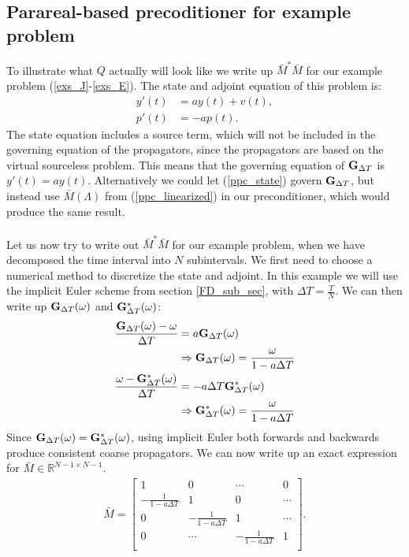 \subsection{Parareal-based precoditioner for example problem}
To illustrate what $Q$ actually will look like we write up $\bar M^*\bar M$ for our example problem (\ref{exs_J}-\ref{exs_E}). The state and adjoint equation of this problem is:
\begin{align}
y'(t) &= ay(t) + v(t), \label{ppc_state} \\
p'(t) &= -ap(t). \label{ppc_adjoint}
\end{align}
The state equation includes a source term, which will not be included in the governing equation of the propagators, since the propagators are based on the virtual sourceless problem. This means that the governing equation of $\bold G_{\Delta T}$ is $y'(t) = ay(t)$. Alternatively we could let (\ref{ppc_state}) govern $\bold G_{\Delta T}$, but instead use $\bar M(\Lambda)$ from (\ref{ppc_linearized}) in our preconditioner, which would produce the same result. 
\\
\\
Let us now try to write out $\bar M^*\bar M$ for our example problem, when we have decomposed the time interval into $N$ subintervals. We first need to choose a numerical method to discretize the state and adjoint. In this example we will use the implicit Euler scheme from section \ref{FD_sub_sec}, with $\Delta T=\frac{T}{N}$. We can then write up $\bold G_{\Delta T}(\omega)$ and $\bold G_{\Delta T}^*(\omega)$:
\begin{align*}
\frac{\bold G_{\Delta T}(\omega)-\omega}{\Delta T}&=  a\bold G_{\Delta T}(\omega) \\
&\Rightarrow \bold G_{\Delta T}(\omega)= \frac{\omega}{1-a\Delta T} \\
\frac{\omega-\bold G_{\Delta T}^*(\omega)}{\Delta T}&= -a\Delta T \bold G_{\Delta T}^*(\omega) \\
&\Rightarrow \bold G_{\Delta T}^*(\omega)= \frac{\omega}{1-a\Delta T} 
\end{align*}
Since $\bold G_{\Delta T}(\omega)= \bold G_{\Delta T}^*(\omega)$, using implicit Euler both forwards and backwards produce consistent coarse propagators. We can now write up an exact expression for $\bar M\in\mathbb{R}^{N-1\times N-1}$. 
\begin{align*}
\bar M = \left[ \begin{array}{cccc}
   	1 & 0 & \cdots & 0 \\  
   	-\frac{1}{1-a\Delta T} & 1 & 0 & \cdots \\ 
   	0 &-\frac{1}{1-a\Delta T} & 1  & \cdots \\
   	0 &\cdots &-\frac{1}{1-a\Delta T} & 1  \\
  	\end{array}  \right].
\end{align*}
